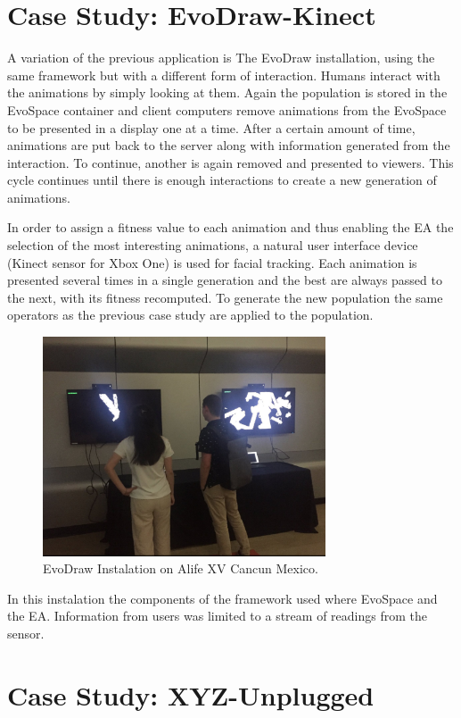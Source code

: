 \section{Case Study: EvoDraw-Kinect}
\label{sec:kinect}
A variation of the previous application is The EvoDraw installation, using the same
framework but with a different form of interaction. Humans interact with the animations 
by simply looking at them. Again the population is stored in the EvoSpace container and
client computers remove animations from the EvoSpace to be presented in a display one at a time. 
After a certain amount of time,  animations are put back to the server along with information 
generated from the interaction. To continue, another is again removed and presented to viewers. 
This cycle continues until there is enough interactions to create a new generation of animations. 

In order to assign a fitness value to each animation and thus enabling 
the EA the selection of the most interesting animations, a natural user interface 
device (Kinect sensor for Xbox One) is used for facial tracking. Each animation is 
presented several times in a single generation and the best are always passed to the next, 
with its fitness recomputed. To generate the new population the same operators as the previous case study
are applied to the population. 

\begin{figure}[!t]
    \centering
        \includegraphics[width=3.3in]{img/kinect.png}
    \caption{EvoDraw Instalation on Alife XV Cancun Mexico.}
    \label{fig:kinect}
\end{figure}

In this instalation the components of the framework used where EvoSpace and the EA.
Information from users was limited to a stream of readings from the sensor.

\section{Case Study: XYZ-Unplugged}
\label{sec:xyz}

